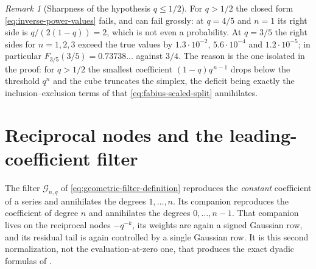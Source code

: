 \documentclass[11pt,a4paper,oneside,openany]{book}
\theoremstyle{definition}
\theoremstyle{remark}
\newtheorem{remark}[remark]{Remark}
\begin{document}
\begin{remark}[Sharpness of the hypothesis $q\le1/2$]\label{rem:inverse-power-sharpness}
For $q>1/2$ the closed form \eqref{eq:inverse-power-values} fails, and can fail grossly:
at $q=4/5$ and $n=1$ its right side is $q/(2(1-q))=2$, which is not even a probability.
At $q=3/5$ the right sides for $n=1,2,3$ exceed the true values by
$1.3\cdot10^{-2}$, $5.6\cdot10^{-4}$ and $1.2\cdot10^{-5}$; in particular
$F_{3/5}(3/5)=0.73738\ldots$ against $3/4$.  The reason is the one isolated in the proof:
for $q>1/2$ the smallest coefficient $(1-q)q^{\,n-1}$ drops below the threshold $q^n$ and
the cube truncates the simplex, the deficit being exactly the inclusion--exclusion terms
of  that \eqref{eq:fabius-scaled-split} annihilates.
\end{remark}

\section{Reciprocal nodes and the leading-coefficient filter}

The filter $\mathcal G_{n,q}$ of \eqref{eq:geometric-filter-definition} reproduces the \emph{constant} coefficient of a series and annihilates the degrees $1,\ldots,n$.  Its companion reproduces the coefficient of degree $n$ and annihilates the degrees $0,\ldots,n-1$.  That companion lives on the reciprocal nodes $-q^{-k}$, its weights are again a signed Gaussian row, and its residual tail is again controlled by a single Gaussian row.  It is this second normalization, not the evaluation-at-zero one, that produces the exact dyadic formulas of .
\end{document}
